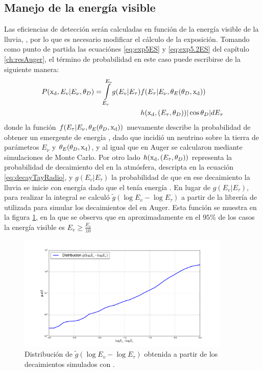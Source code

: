 	\subsection{Manejo de la energ\'ia visible}
	Las eficiencias de detecci\'on ser\'an calculadas en funci\'on de la energ\'ia visible de la lluvia, \ev{}, por lo que es necesario modificar el c\'alculo de la exposici\'on.
	Tomando como punto de partida las ecuaci\'ones \ref{eq:exp5ES} y \ref{eq:exp5.2ES} del cap\'itulo \ref{ch:resAuger}, el t\'ermino de probabilidad en este caso puede escribirse de la siguiente manera:
	\begin{equation}
		\begin{aligned}
		P({\rm x_d},E_v|E_{\nu},\theta_D)=
		\int\limits_{E_v}^{E_\nu}
		g(E_v|E_\tau)
		& f(E_\tau|E_\nu,\theta_E(\theta_D,{\rm x_d}))\\
		&h({\rm x_d},(E_\tau,\theta_D))
		|\cos\theta_D|
		dE_\tau
		\end{aligned}
	\end{equation}
	donde la funci\'on $f(E_\tau|E_\nu,\theta_E(\theta_D,{\rm x_d}))$ nuevamente describe la probabilidad de obtener un \tauon{} emergente de energ\'ia \etau{}, dado que incidi\'o un neutrino sobre la tierra de par\'ametros $E_\nu$ y $\theta_E(\theta_D,{\rm x_d})$, y al igual que en Auger se calcularon mediante simulaciones de Monte Carlo.
	Por otro lado $h({\rm x_d},(E_\tau,\theta_D))$ representa la probabilidad de decaimiento del \tauon{} en la atm\'osfera, descripta en la ecuaci\'on \ref{eq:decayTayRadio}, y $g(E_v|E_\tau)$ la probabilidad de que en ese decaimiento la lluvia se inicie con energ\'ia \ev{} dado que el \tauon{} ten\'ia energ\'ia \etau{}.
	En lugar de $g(E_v|E_\tau)$, para realizar la integral se calcul\'o $\tilde{g}(\log E_v-\log E_\tau)$ a partir de la librer\'ia de \tauola{} utilizada para simular los decaimientos del \tauon{} en Auger.
	Esta funci\'on se muestra en la figura \ref{fig:ev_etau}, en la que se observa que en aproximadamente en el $95\%$ de los casos la energ\'ia visible es $E_v\geq\frac{E_\tau}{10}$
	 \begin{figure}[h!]
		\begin{center}
			\includegraphics[width=0.9\textwidth]{fig/resultadosRadio/ev_etau.pdf}
			\caption{\label{fig:ev_etau} 
			Distribuci\'on de $\tilde{g}(\log E_v-\log E_\tau)$ obtenida a partir de los decaimientos simulados con \tauola{}. 
			}
		\end{center}
	\end{figure}
	 
